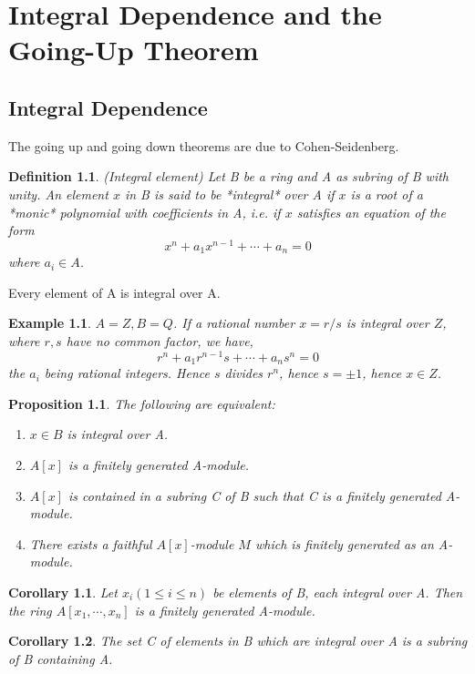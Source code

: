 \documentclass[]{report}
\newtheorem{prop}[theorem]{Proposition}
\newtheorem{corollary}{Corollary}[theorem]
\newtheorem{defn}[theorem]{Definition}
\newtheorem{examples}[theorem]{Example}
\begin{document}
\chapter{Integral Dependence and the Going-Up Theorem}

\section{Integral Dependence}

The going up and going down theorems are due to Cohen-Seidenberg.

\begin{defn} 
    (Integral element) Let B be a ring and A as subring of B with unity. An element $x$ in B is said to be *integral* over A if $x$ is a root of a *monic* polynomial with coefficients in A, i.e. if $x$ satisfies an equation of the form
$$x^n + a_1x^{n-1} + \cdots + a_n = 0$$
where $a_i\in A$. 
\end{defn}

Every element of A is integral over A.

\begin{examples} 
    $A = Z, B = Q$. If a rational number $x=r/s$ is integral over $Z$, where $r,s$ have no common factor, we have,
$$r^n + a_1r^{n-1}s + \cdots + a_ns^n = 0$$
the $a_i$ being rational integers. Hence $s$ divides $r^n$, hence $s=\pm 1$, hence $x\in Z$.
\end{examples}

\begin{prop}
    The following are equivalent:
    \begin{enumerate}
        \item $x\in B$ is integral over A.
        \item $A[x]$ is a finitely generated A-module.
        \item $A[x]$ is contained in a subring C of B such that C is a finitely generated A-module.
        \item There exists a faithful $A[x]$-module $M$ which is finitely generated as an A-module.
    \end{enumerate}
\end{prop}

\begin{corollary}
    Let $x_i (1 \leq i \leq n)$ be elements of B, each integral over A. Then the ring $A[x_1,\cdots,x_n]$ is a finitely generated A-module.
\end{corollary}

\begin{corollary}
    The set C of elements in B which are integral over A is a subring of B containing A. 
\end{corollary}
\end{document}
